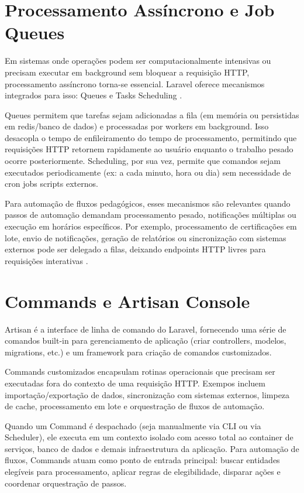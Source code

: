 \section{Processamento Assíncrono e Job Queues}
\label{sec:revbib:async}

Em sistemas onde operações podem ser computacionalmente intensivas ou precisam
executar em background sem bloquear a requisição HTTP, processamento assíncrono
torna-se essencial. Laravel oferece mecanismos integrados para isso: Queues
\cite{LaravelQueues2024} e Tasks Scheduling \cite{LaravelScheduler2024}.

Queues permitem que tarefas sejam adicionadas a fila (em memória ou persistidas
em redis/banco de dados) e processadas por workers em background. Isso
desacopla o tempo de enfileiramento do tempo de processamento, permitindo que
requisições HTTP retornem rapidamente ao usuário enquanto o trabalho pesado
ocorre posteriormente. Scheduling, por sua vez, permite que comandos sejam
executados periodicamente (ex: a cada minuto, hora ou dia) sem necessidade de
cron jobs scripts externos.

Para automação de fluxos pedagógicos, esses mecanismos são relevantes quando
passos de automação demandam processamento pesado, notificações múltiplas ou
execução em horários específicos. Por exemplo, processamento de certificações
em lote, envio de notificações, geração de relatórios ou sincronização com
sistemas externos pode ser delegado a filas, deixando endpoints HTTP livres
para requisições interativas \cite{LaravelQueues2024}.

\section{Commands e Artisan Console}
\label{sec:revbib:commands}

Artisan \cite{LaravelCommands2024} é a interface de linha de comando do Laravel,
fornecendo uma série de comandos built-in para gerenciamento de aplicação
(criar controllers, modelos, migrations, etc.) e um framework para criação de
comandos customizados.

Commands customizados encapsulam rotinas operacionais que precisam ser
executadas fora do contexto de uma requisição HTTP. Exempos incluem
importação/exportação de dados, sincronização com sistemas externos, limpeza
de cache, processamento em lote e orquestração de fluxos de automação.

Quando um Command é despachado (seja manualmente via CLI ou via Scheduler),
ele executa em um contexto isolado com acesso total ao container de serviços,
banco de dados e demais infraestrutura da aplicação. Para automação de fluxos,
Commands atuam como ponto de entrada principal: buscar entidades elegíveis
para processamento, aplicar regras de elegibilidade, disparar ações e
coordenar orquestração de passos.

